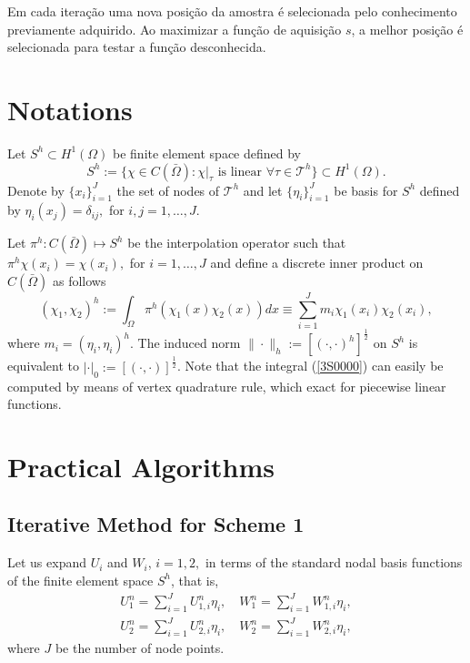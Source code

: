 Em cada iteração uma nova posição da amostra é selecionada pelo conhecimento previamente adquirido. Ao maximizar a função de aquisição $s$, a melhor posição é selecionada para testar a função desconhecida.

\setcounter{equation}{0}
\section{Notations}
Let $S^h \subset H^1(\Omega)$ be finite element space defined by
\[S^h:=\{\chi \in C(\bar \Omega): \chi|_\tau \mbox{ is linear }
\forall \tau \in \mathcal{T}^h\} \subset H^1(\Omega).\]
Denote by $\{x_i\}_{i=1}^{J}$ the set of nodes of $ \mathcal{T}^h$
and let $ \{\eta_i\}_{i=1}^{J}$ be basis for $S^h$ defined by
$\eta_i(x_j)=\delta_{ij},$ for $i,j=1, \dots ,J$.

Let $\pi^h: C(\bar \Omega)\mapsto S^h $ be the interpolation
operator such that  $\pi^h\chi(x_i)=\chi(x_i),$ for $i=1, \dots , J$
and define a discrete inner product on $C(\bar \Omega)$ as follows
\begin{equation}
(\chi_1,\chi_2)^h:=\int_{\Omega}\pi^h(\chi_1(x)\chi_2(x))dx \equiv
\sum_{i=1}^{J}m_i\chi_1(x_i)\chi_2(x_i),\label{3S0000}
\end{equation}
where $m_i=(\eta_i,\eta_i)^h$. The induced norm
$\|\cdot\|_h:=[(\cdot,\cdot)^h]^{\frac{1}{2}}$ on $S^h$ is equivalent to
$|\cdot|_0:=[(\cdot,\cdot)]^{\frac{1}{2}}$.  Note that the integral
(\ref{3S0000}) can easily be computed by means of vertex quadrature
rule, which exact for piecewise linear functions.


\setcounter{equation}{0}
\section{Practical Algorithms}
\subsection{Iterative  Method for Scheme 1 \label{implicit}}
Let us expand $U_i$ and $W_i$, $i=1,2,$  in terms of the standard
nodal basis functions of the finite element space $S^h$, that
is,
\eqlabon 
\begin{align}
U^n_1=\sum_{i=1}^{J}U_{1,i}^n\eta_i,\quad W^n_1=\sum_{i=1}^{J}W_{1,i}^n\eta_i,\label{5E0001a}\\
U^n_2=\sum_{i=1}^{J}U_{2,i}^n\eta_i,\quad W^n_2=\sum_{i=1}^{J}W_{2,i}^n\eta_i,\label{5E0001b}
\end{align}
where $J$ be the number of node points. 
\eqlaboff

